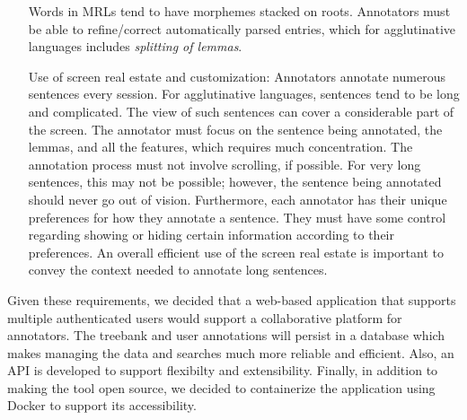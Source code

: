 \begin{itemize}[before=\normalfont, font=\itshape, align=left,noitemsep,topsep=0pt,parsep=0pt,partopsep=0pt,labelwidth=5cm,align=left,itemindent=5cm]
        Words in MRLs tend to have morphemes stacked on roots.
        Annotators must be able to refine/correct automatically parsed entries, which for agglutinative languages includes \textit{splitting of lemmas}.
    \item[Use of screen real estate and customization:]
        Annotators annotate numerous sentences every session.
        For agglutinative languages, sentences tend to be long and complicated.
        The view of such sentences can cover a considerable part of the screen.
        The annotator must focus on the sentence being annotated, the lemmas, and all the features, which requires much concentration.
        The annotation process must not involve scrolling, if possible.
        For very long sentences, this may not be possible; however, the sentence being annotated should never go out of vision.
        Furthermore, each annotator has their unique preferences for how they annotate a sentence.
        They must have some control regarding showing or hiding certain information according to their preferences.
        An overall efficient use of the screen real estate is important to convey the context needed to annotate long sentences.
\end{itemize}

Given these requirements, we decided that a web-based application that supports multiple authenticated users would support a collaborative platform for annotators.
The treebank and user annotations will persist in a database which makes managing the data and searches much more reliable and efficient.
Also, an API is developed to support flexibilty and extensibility.
Finally, in addition to making the tool open source, we decided to containerize the application using Docker\cite{docker} to support its accessibility.
